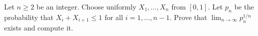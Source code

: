 \begin{problem}
    Let \( n\geq 2 \) be an integer. Choose uniformly \( X_1, \ldots, X_n \) from \( \left[0, 1\right] \). Let \( p_n \) be the probability that \( X_i + X_{i+1} \leq 1 \) for all \( i = 1, \ldots, n-1 \). Prove that \( \lim_{n \to \infty} p_n^{1/n} \) exists and compute it.
\end{problem}
